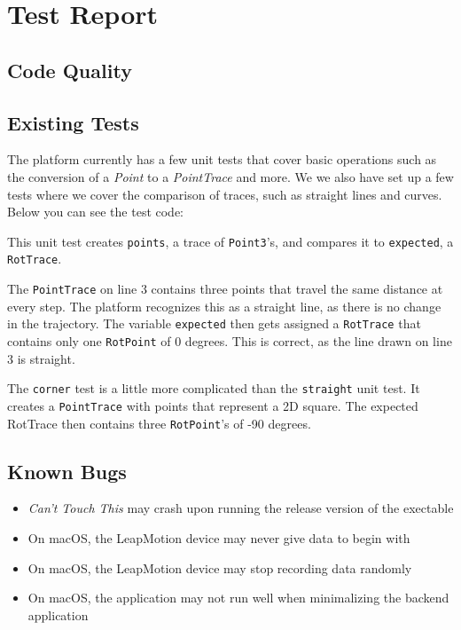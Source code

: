 \documentclass[a4paper]{article}
\providecommand{\tightlist}{%
\setlength{\itemsep}{0pt}\setlength{\parskip}{0pt}}
\begin{document}
  \section{Test Report}
  \subsection{Code Quality} %
  \subsection{Existing Tests} %
  The platform currently has a few unit tests that cover basic operations such
  as the conversion of a \textit{Point} to a \textit{PointTrace} and more. We
  we also have set up a few tests where we cover the comparison of traces, such
  as straight lines and curves. Below you can see the test code:
  

  This unit test creates \verb_points_, a trace of \verb_Point3_'s, and compares
  it to \verb_expected_, a \verb_RotTrace_.

  The \verb_PointTrace_ on line 3 contains three points that travel the same
  distance at every step. The platform recognizes this as a straight line, as
  there is no change in the trajectory. The variable \verb_expected_ then gets
  assigned a \verb_RotTrace_ that contains only one \verb_RotPoint_ of 0
  degrees. This is correct, as the line drawn on line 3 is straight.

  
  The \verb_corner_ test is a little more complicated than the \verb_straight_
  unit test. It creates a \verb_PointTrace_ with points that represent a 2D
  square. The expected RotTrace then contains three \verb_RotPoint_'s of -90
  degrees.

  \subsection{Known Bugs}
  \begin{itemize}
    \tightlist{}
    \item \textit{Can't Touch This} may crash upon running the release version
      of the exectable
    \item On macOS, the LeapMotion device may never give data to begin with
    \item On macOS, the LeapMotion device may stop recording data randomly
    \item On macOS, the application may not run well when minimalizing the
      backend application
  \end{itemize}
\end{document}
